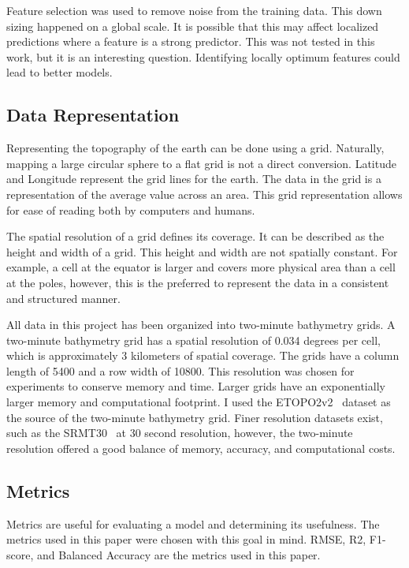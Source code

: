 \par
Feature selection was used to remove noise from the training data.
This down sizing happened on a global scale.
It is possible that this may affect localized predictions where a feature is a strong predictor.
This was not tested in this work, but it is an interesting question.
Identifying locally optimum features could lead to better models.


\subsection{Data Representation}
Representing the topography of the earth can be done using a grid. 
Naturally, mapping a large circular sphere to a flat grid is not a direct conversion.
Latitude and Longitude represent the grid lines for the earth.
The data in the grid is a representation of the average value across an area.
This grid representation allows for ease of reading both by computers and humans.

\par
The spatial resolution of a grid defines its coverage.
It can be described as the height and width of a grid.
This height and width are not spatially constant.
For example, a cell at the equator is larger and covers more physical area than a cell at the poles, however, this is the preferred to represent the data in a consistent and structured manner.

\par
All data in this project has been organized into two-minute bathymetry grids.
A two-minute bathymetry grid has a spatial resolution of 0.034 degrees per cell, which is approximately 3 kilometers of spatial coverage.
The grids have a column length of 5400 and a row width of 10800.
This resolution was chosen for experiments to conserve memory and time.
Larger grids have an exponentially larger memory and computational footprint.
I used the \ac{ETOPO}2v2~\cite{national1988etopo} dataset as the source of the two-minute bathymetry grid.
Finer resolution datasets exist, such as the SRMT30~\cite{becker2009global} at 30 second resolution, however, the two-minute resolution offered a good balance of memory, accuracy, and computational costs.

\subsection{Metrics}
Metrics are useful for evaluating a model and determining its usefulness.
The metrics used in this paper were chosen with this goal in mind.
RMSE, R2, F1-score, and Balanced Accuracy are the metrics used in this paper.

